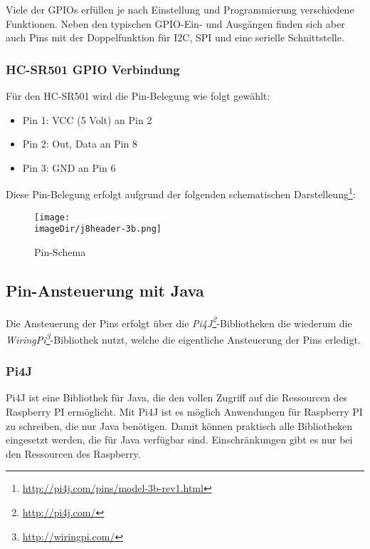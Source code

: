 Viele der GPIOs erfüllen je nach Einstellung und Programmierung verschiedene Funktionen. Neben den typischen GPIO-Ein- und Ausgängen finden sich aber auch Pins mit der Doppelfunktion für I2C, SPI und eine serielle Schnittstelle.\\

\subsubsection{HC-SR501 GPIO Verbindung}

Für den HC-SR501 wird die Pin-Belegung wie folgt gewählt:

\begin{itemize}
	\item Pin 1: VCC (5 Volt) an Pin 2
	\item Pin 2: Out, Data an Pin 8
	\item Pin 3: GND an Pin 6
\end{itemize}

Diese Pin-Belegung erfolgt aufgrund der folgenden schematischen Darstelleung\footnote{\url{http://pi4j.com/pins/model-3b-rev1.html}}:

\begin{figure}[h]
	\centering
	\texttt{[image: \\imageDir/j8header-3b.png]}
	\caption{Pin-Schema}
	\label{fig:j8header-3b}
\end{figure}

\pagebreak

\subsection{Pin-Ansteuerung mit Java}

Die Ansteuerung der Pins erfolgt über die \emph{Pi4J\footnote{\url{http://pi4j.com/}}}-Bibliotheken die wiederum die \emph{WiringPi\footnote{\url{http://wiringpi.com/}}}-Bibliothek nutzt, welche die eigentliche Ansteuerung der Pins erledigt.

\subsubsection{Pi4J}
Pi4J ist eine Bibliothek  für Java, die den vollen Zugriff auf die Ressourcen des Raspberry PI ermöglicht. Mit Pi4J ist es möglich Anwendungen für Raspberry PI zu schreiben, die nur Java benötigen. Damit können praktisch alle Bibliotheken eingesetzt werden, die für Java verfügbar sind. Einschränkungen gibt es nur bei den Ressourcen des Raspberry.


